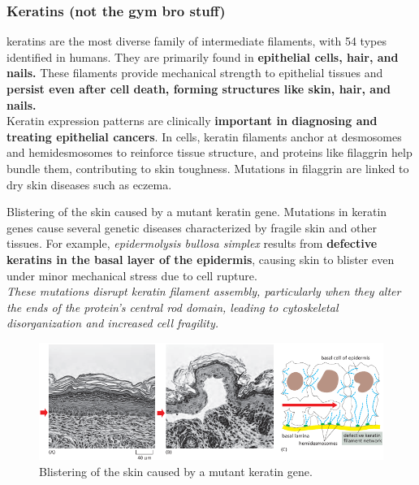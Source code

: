 \documentclass[../main.tex]{subfiles}
\begin{document}
\subsubsection{Keratins (not the gym bro stuff)}

\gls{keratins} are the most diverse family of intermediate filaments, with 54 types identified in humans. They are primarily found in \textbf{epithelial cells, hair, and nails.} These filaments provide mechanical strength to epithelial tissues and \textbf{persist even after cell death, forming structures like skin, hair, and nails.}\\
\indent Keratin expression patterns are clinically \textbf{important in diagnosing and treating epithelial cancers}. In cells, keratin filaments anchor at desmosomes and hemidesmosomes to reinforce tissue structure, and proteins like filaggrin help bundle them, contributing to skin toughness. Mutations in filaggrin are linked to dry skin diseases such as eczema.

\begin{RemarkWithTitel}{Blistering of the skin caused by a mutant keratin gene.}
	Mutations in keratin genes cause several genetic diseases characterized by fragile skin and other tissues. For example, \textit{epidermolysis bullosa simplex} results from \textbf{defective keratins in the basal layer of the epidermis}, causing skin to blister even under minor mechanical stress due to cell rupture. \\
	\indent \textit{These mutations disrupt keratin filament assembly, particularly when they alter the ends of the protein’s central rod domain, leading to cytoskeletal disorganization and increased cell fragility.}

	\begin{figure}[H]
		\centering
		\includegraphics[width = 0.9 \textwidth]{41}
		\caption{Blistering of the skin caused by a mutant keratin gene.}
	\end{figure}
\end{RemarkWithTitel}



\printglossaries
	
\end{document}

